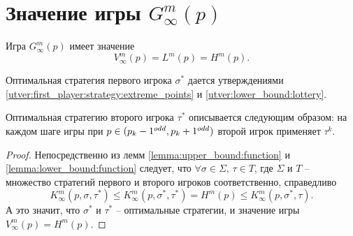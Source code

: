 \section{Значение игры $ G_\infty^m(p) $}
\begin{theorem}
\label{theorem:infinite_game:value}
Игра $ G_\infty^m(p) $ имеет значение 
\[
V_\infty^m(p) = L^m(p) = H^m(p).
\]

Оптимальная стратегия первого игрока $ \sigma^* $ дается утверждениями \ref{utver:first_player:strategy:extreme_points} и \ref{utver:lower_bound:lottery}.

Оптимальная стратегию второго игрока $ \tau^* $ описывается следующим образом: на каждом шаге игры при $ p \in (p_k-1^{odd}, p_k+1^{odd}) $ второй игрок применяет $ \tau^k $.
\end{theorem}
\begin{proof}
Непосредственно из лемм \ref{lemma:upper_bound:function} и \ref{lemma:lower_bound:function} следует, что
$ \forall \sigma \in \Sigma, \, \tau \in T $, где $ \Sigma $ и $ T $ -- множество стратегий первого и второго игроков соответственно, справедливо
\[
  K_\infty^m(p, \sigma, \tau^*)
\leq K_\infty^m(p, \sigma^*, \tau^*) = H^m(p) \leq 
  K_\infty^m(p, \sigma^*, \tau).
\]
А это значит, что $ \sigma^* $ и $ \tau^* $ -- оптимальные стратегии, и значение игры $ V_\infty^m(p) = H^m(p) $.
\end{proof}
